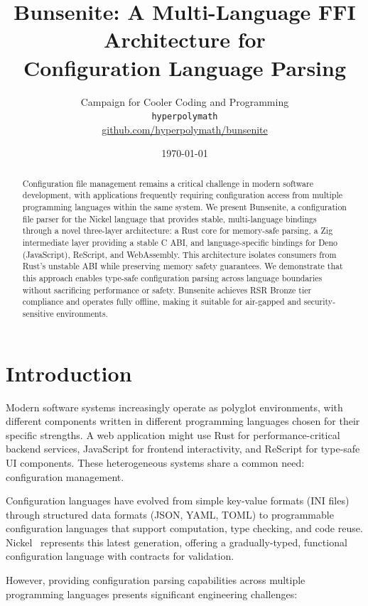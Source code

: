 \documentclass[11pt,a4paper]{article}
\title{Bunsenite: A Multi-Language FFI Architecture for\\Configuration Language Parsing}
\author{
    Campaign for Cooler Coding and Programming\\
    \texttt{hyperpolymath}\\
    \href{https://github.com/hyperpolymath/bunsenite}{github.com/hyperpolymath/bunsenite}
}
\date{\today}
\begin{document}
\maketitle

\begin{abstract}
Configuration file management remains a critical challenge in modern software development, with applications frequently requiring configuration access from multiple programming languages within the same system. We present Bunsenite, a configuration file parser for the Nickel language that provides stable, multi-language bindings through a novel three-layer architecture: a Rust core for memory-safe parsing, a Zig intermediate layer providing a stable C ABI, and language-specific bindings for Deno (JavaScript), ReScript, and WebAssembly. This architecture isolates consumers from Rust's unstable ABI while preserving memory safety guarantees. We demonstrate that this approach enables type-safe configuration parsing across language boundaries without sacrificing performance or safety. Bunsenite achieves RSR Bronze tier compliance and operates fully offline, making it suitable for air-gapped and security-sensitive environments.
\end{abstract}

\section{Introduction}

Modern software systems increasingly operate as polyglot environments, with different components written in different programming languages chosen for their specific strengths. A web application might use Rust for performance-critical backend services, JavaScript for frontend interactivity, and ReScript for type-safe UI components. These heterogeneous systems share a common need: configuration management.

Configuration languages have evolved from simple key-value formats (INI files) through structured data formats (JSON, YAML, TOML) to programmable configuration languages that support computation, type checking, and code reuse. Nickel~\cite{nickel} represents this latest generation, offering a gradually-typed, functional configuration language with contracts for validation.

However, providing configuration parsing capabilities across multiple programming languages presents significant engineering challenges:
\end{document}
